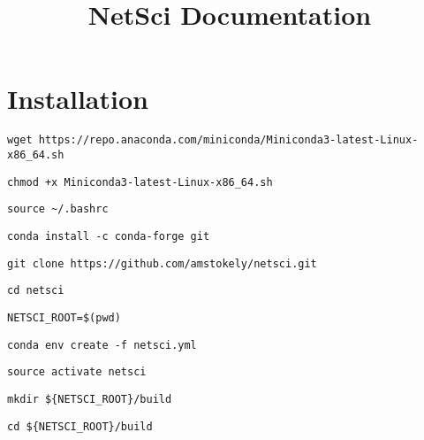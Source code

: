 \documentclass{article}
\title{NetSci Documentation}
\date{}
\begin{document}
    \maketitle


    \section{Installation}

    \begin{lstlisting}
wget https://repo.anaconda.com/miniconda/Miniconda3-latest-Linux-x86_64.sh
    \end{lstlisting}

    \begin{lstlisting}
chmod +x Miniconda3-latest-Linux-x86_64.sh
    \end{lstlisting}

    \begin{lstlisting}
source ~/.bashrc
    \end{lstlisting}

    \begin{lstlisting}
conda install -c conda-forge git
    \end{lstlisting}

    \begin{lstlisting}
git clone https://github.com/amstokely/netsci.git
    \end{lstlisting}

    \begin{lstlisting}
cd netsci
    \end{lstlisting}

    \begin{lstlisting}
NETSCI_ROOT=$(pwd)
    \end{lstlisting}

    \begin{lstlisting}
conda env create -f netsci.yml
    \end{lstlisting}

    \begin{lstlisting}
source activate netsci
    \end{lstlisting}

    \begin{lstlisting}
mkdir ${NETSCI_ROOT}/build
    \end{lstlisting}

    \begin{lstlisting}
cd ${NETSCI_ROOT}/build
    \end{lstlisting}
\end{document}
